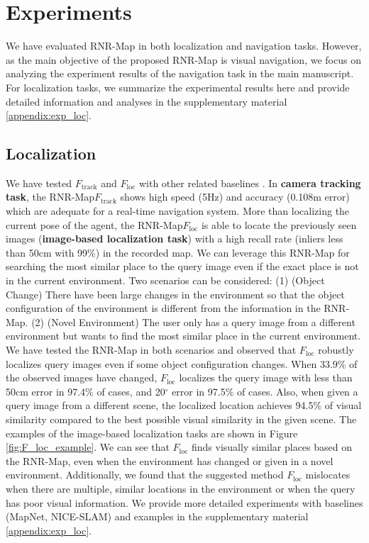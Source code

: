 \documentclass[10pt,twocolumn,letterpaper]{article}
\def\proposed{RNR-Map\xspace}
\begin{document}
\section{Experiments}
We have evaluated \proposed in both localization and navigation tasks.
%
However, as the main objective of the proposed \proposed is visual navigation, we focus on analyzing the experiment results of the navigation task in the main manuscript.
%
For localization tasks, we summarize the experimental results here and provide detailed information and analyses in the supplementary material \ref{appendix:exp_loc}. 
%
\subsection{Localization}
%
We have tested $F_\mathrm{track}$ and $F_\mathrm{loc}$ with other related baselines \cite{MapNet, nice-slam}.
%
In \textbf{camera tracking task}, the \proposed $F_\mathrm{track}$ shows high speed (5Hz) and accuracy (0.108m error) which are adequate for a real-time navigation system.
%
More than localizing the current pose of the agent, the \proposed $F_\mathrm{loc}$ is able to locate the previously seen images (\textbf{image-based localization task}) with a high recall rate (inliers less than 50cm with 99\%) in the recorded map.
%
We can leverage this \proposed  for searching the most similar place to the query image even if the exact place is not in the current environment.
%
Two scenarios can be considered: (1) (Object Change) There have been large changes in the environment so that the object configuration of the environment is different from the information in the \proposed. 
%
(2) (Novel Environment) The user only has a query image from a different environment but wants to find the most similar place in the current environment.
%
We have tested the \proposed in both scenarios and observed that $F_\mathrm{loc}$ robustly localizes query images even if some object configuration changes. 
%
When 33.9\% of the observed images have changed, $F_\mathrm{loc}$ localizes the query image with less than 50cm error in 97.4\% of cases, and 20$^\circ$ error in 97.5\% of cases. 
%
Also, when given a query image from a different scene, the localized location achieves 94.5\% of visual similarity compared to the best possible visual similarity in the given scene.
%
The examples of the image-based localization tasks are shown in Figure \ref{fig:F_loc_example}.
%
We can see that $F_\mathrm{loc}$ finds visually similar places based on the \proposed, even when the environment has changed or given in a novel environment.
%
Additionally, we found that the suggested method $F_\mathrm{loc}$ mislocates when there are multiple, similar locations in the environment or when the query has poor visual information.
%
We provide more detailed experiments with baselines (MapNet\cite{MapNet}, NICE-SLAM\cite{nice-slam}) and examples in the supplementary material \ref{appendix:exp_loc}.
\end{document}

